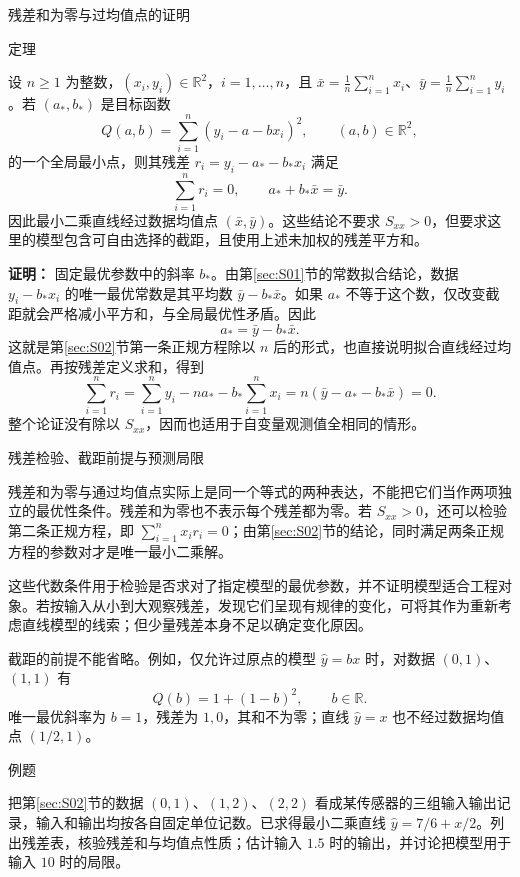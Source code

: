 \documentclass[aspectratio=169,10pt,fontset=fandol]{ctexbeamer}
\begin{document}
\begin{frame}[t,fragile]{残差和为零与过均值点的证明}
\footnotesize
\begin{block}{定理}
{\footnotesize
设 $n\geq1$ 为整数，$(x_i,y_i)\in\mathbb{R}^2$，$i=1,\ldots,n$，且 $\bar{x}=\frac1n\sum_{i=1}^{n}x_i$、$\bar{y}=\frac1n\sum_{i=1}^{n}y_i$。若 $(a_*,b_*)$ 是目标函数
\[
Q(a,b)=\sum_{i=1}^{n}(y_i-a-bx_i)^2,\qquad (a,b)\in\mathbb{R}^2,
\]
的一个全局最小点，则其残差 $r_i=y_i-a_*-b_*x_i$ 满足
\[
\sum_{i=1}^{n}r_i=0,\qquad a_*+b_*\bar{x}=\bar{y}.
\]
因此最小二乘直线经过数据均值点 $(\bar{x},\bar{y})$。这些结论不要求 $S_{xx}>0$，但要求这里的模型包含可自由选择的截距，且使用上述未加权的残差平方和。

}
\end{block}
\pause
{\footnotesize
\textbf{证明：}
固定最优参数中的斜率 $b_*$。由第\ref{sec:S01}节的常数拟合结论，数据 $y_i-b_*x_i$ 的唯一最优常数是其平均数 $\bar{y}-b_*\bar{x}$。如果 $a_*$ 不等于这个数，仅改变截距就会严格减小平方和，与全局最优性矛盾。因此
\[
a_* =\bar{y}-b_*\bar{x}.
\]
这就是第\ref{sec:S02}节第一条正规方程除以 $n$ 后的形式，也直接说明拟合直线经过均值点。再按残差定义求和，得到
\[
\sum_{i=1}^{n}r_i
=\sum_{i=1}^{n}y_i-na_*-b_*\sum_{i=1}^{n}x_i
=n(\bar{y}-a_*-b_*\bar{x})=0.
\]
整个论证没有除以 $S_{xx}$，因而也适用于自变量观测值全相同的情形。

}
\end{frame}
\begin{frame}[t,fragile]{残差检验、截距前提与预测局限}
\normalsize
{\normalsize
残差和为零与通过均值点实际上是同一个等式的两种表达，不能把它们当作两项独立的最优性条件。残差和为零也不表示每个残差都为零。若 $S_{xx}>0$，还可以检验第二条正规方程，即 $\sum_{i=1}^{n}x_i r_i=0$；由第\ref{sec:S02}节的结论，同时满足两条正规方程的参数对才是唯一最小二乘解。


}
{\normalsize
这些代数条件用于检验是否求对了指定模型的最优参数，并不证明模型适合工程对象。若按输入从小到大观察残差，发现它们呈现有规律的变化，可将其作为重新考虑直线模型的线索；但少量残差本身不足以确定变化原因。


}
{\normalsize
截距的前提不能省略。例如，仅允许过原点的模型 $\hat{y}=bx$ 时，对数据 $(0,1)$、$(1,1)$ 有
\[
Q(b)=1+(1-b)^2,\qquad b\in\mathbb{R}.
\]
唯一最优斜率为 $b=1$，残差为 $1,0$，其和不为零；直线 $\hat{y}=x$ 也不经过数据均值点 $(1/2,1)$。\par

}
\begin{block}{例题}
{\normalsize
把第\ref{sec:S02}节的数据 $(0,1)$、$(1,2)$、$(2,2)$ 看成某传感器的三组输入输出记录，输入和输出均按各自固定单位记数。已求得最小二乘直线 $\hat{y}=7/6+x/2$。列出残差表，核验残差和与均值点性质；估计输入 $1.5$ 时的输出，并讨论把模型用于输入 $10$ 时的局限。

}
\end{block}
\end{frame}
\end{document}
